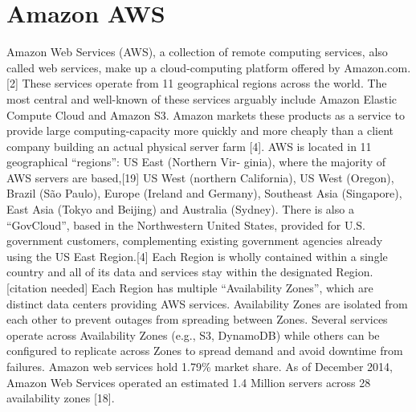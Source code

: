 \section{Amazon AWS}
\label{sec:Amazon AWS}

Amazon Web Services (AWS), a collection of remote computing services, also called web services, make up a cloud-computing platform offered by Amazon.com.[2] These services operate from 11 geographical regions across the world. The most central and well-known of these services arguably include Amazon Elastic Compute Cloud and Amazon S3. Amazon markets these products as a service to provide large computing-capacity more quickly and more cheaply than a client company building an actual physical server farm [4].
AWS is located in 11 geographical “regions”: US East (Northern Vir- ginia), where the majority of AWS servers are based,[19] US West (northern California), US West (Oregon), Brazil (São Paulo), Europe (Ireland and Germany), Southeast Asia (Singapore), East Asia (Tokyo and Beijing) and Australia (Sydney). There is also a “GovCloud”, based in the Northwestern United States, provided for U.S. government customers, complementing existing government agencies already using the US East Region.[4] Each Region is wholly contained within a single country and all of its data and services stay within the designated Region.[citation  needed]
Each Region has multiple “Availability Zones”, which are distinct data centers providing AWS services. Availability Zones are isolated from each other to prevent outages from spreading between Zones. Several services operate across Availability Zones (e.g., S3, DynamoDB) while others can be configured to replicate across Zones to spread demand and avoid downtime from failures. Amazon web services hold 1.79\% market share. As of December 2014, Amazon Web Services operated an estimated 1.4 Million servers across 28 availability zones [18].
